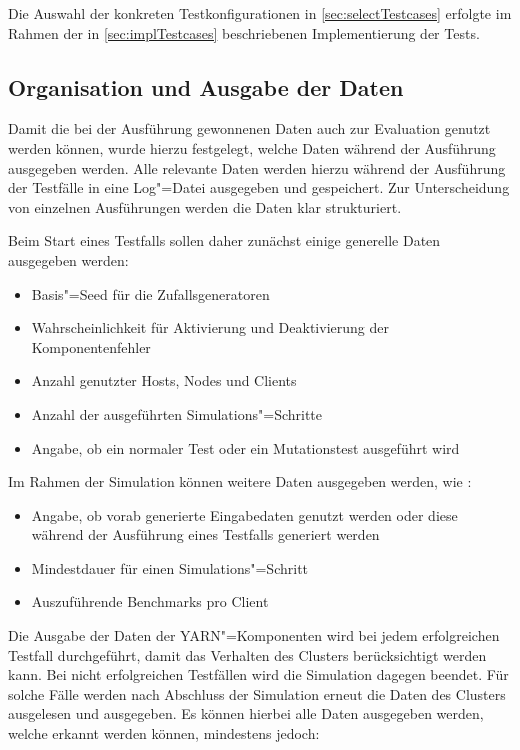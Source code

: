 Die Auswahl der konkreten Testkonfigurationen in \autoref{sec:selectTestcases} erfolgte im Rahmen der in \autoref{sec:implTestcases} beschriebenen Implementierung der Tests.

\subsection{Organisation und Ausgabe der Daten}
\label{sec:dataOrganisation}

Damit die bei der Ausführung gewonnenen Daten auch zur Evaluation genutzt werden können, wurde hierzu festgelegt, welche Daten während der Ausführung ausgegeben werden.
Alle relevante Daten werden hierzu während der Ausführung der Testfälle in eine Log"=Datei ausgegeben und gespeichert.
Zur Unterscheidung von einzelnen Ausführungen werden die Daten klar strukturiert.

Beim Start eines Testfalls sollen daher zunächst einige generelle Daten ausgegeben werden:

\begin{itemize}
    \item Basis"=Seed für die Zufallsgeneratoren
    \item Wahrscheinlichkeit für Aktivierung und Deaktivierung der Komponentenfehler
    \item Anzahl genutzter Hosts, Nodes und Clients
    \item Anzahl der ausgeführten Simulations"=Schritte
    \item Angabe, ob ein normaler Test oder ein Mutationstest ausgeführt wird
\end{itemize}

Im Rahmen der Simulation können weitere Daten ausgegeben werden, wie \zB:

\begin{itemize}
    \item Angabe, ob vorab generierte Eingabedaten genutzt werden oder diese während der Ausführung eines Testfalls generiert werden
    \item Mindestdauer für einen Simulations"=Schritt
    \item Auszuführende Benchmarks pro Client
\end{itemize}

Die Ausgabe der Daten der \ac{YARN}"=Komponenten wird bei jedem erfolgreichen Testfall durchgeführt, damit das Verhalten des Clusters berücksichtigt werden kann.
Bei nicht erfolgreichen Testfällen wird die Simulation dagegen beendet.
Für solche Fälle werden nach Abschluss der Simulation erneut die Daten des Clusters ausgelesen und ausgegeben.
Es können hierbei alle Daten ausgegeben werden, welche erkannt werden können, mindestens jedoch:

